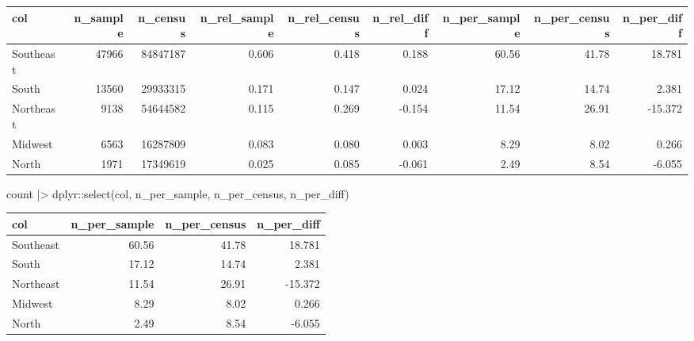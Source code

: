 \documentclass[
  12pt,
  a4paper,
  oneside]{tesesusp}
\newenvironment{Shaded}{\begin{snugshade}}{\end{snugshade}}
\newcommand{\CommentTok}[1]{\textcolor[rgb]{0.37,0.37,0.37}{#1}}
\newcommand{\FunctionTok}[1]{\textcolor[rgb]{0.28,0.35,0.67}{#1}}
\newcommand{\NormalTok}[1]{\textcolor[rgb]{0.00,0.23,0.31}{#1}}
\newcommand{\SpecialCharTok}[1]{\textcolor[rgb]{0.37,0.37,0.37}{#1}}
\begin{document}
\begin{table}
\centering
\begin{tabular}{l|r|r|r|r|r|r|r|r}
\hline
col & n\_sample & n\_census & n\_rel\_sample & n\_rel\_census & n\_rel\_diff & n\_per\_sample & n\_per\_census & n\_per\_diff\\
\hline
Southeast & 47966 & 84847187 & 0.606 & 0.418 & 0.188 & 60.56 & 41.78 & 18.781\\
\hline
South & 13560 & 29933315 & 0.171 & 0.147 & 0.024 & 17.12 & 14.74 & 2.381\\
\hline
Northeast & 9138 & 54644582 & 0.115 & 0.269 & -0.154 & 11.54 & 26.91 & -15.372\\
\hline
Midwest & 6563 & 16287809 & 0.083 & 0.080 & 0.003 & 8.29 & 8.02 & 0.266\\
\hline
North & 1971 & 17349619 & 0.025 & 0.085 & -0.061 & 2.49 & 8.54 & -6.055\\
\hline
\end{tabular}
\end{table}

\begin{Shaded}
\begin{Highlighting}[numbers=left,,]
\NormalTok{count }\SpecialCharTok{|\textgreater{}}\NormalTok{ dplyr}\SpecialCharTok{::}\FunctionTok{select}\NormalTok{(col, n\_per\_sample, n\_per\_census, n\_per\_diff)}
\end{Highlighting}
\end{Shaded}

\begin{table}
\centering
\begin{tabular}{l|r|r|r}
\hline
col & n\_per\_sample & n\_per\_census & n\_per\_diff\\
\hline
Southeast & 60.56 & 41.78 & 18.781\\
\hline
South & 17.12 & 14.74 & 2.381\\
\hline
Northeast & 11.54 & 26.91 & -15.372\\
\hline
Midwest & 8.29 & 8.02 & 0.266\\
\hline
North & 2.49 & 8.54 & -6.055\\
\hline
\end{tabular}
\end{table}

\begin{Shaded}
\end{Shaded}
\end{document}
